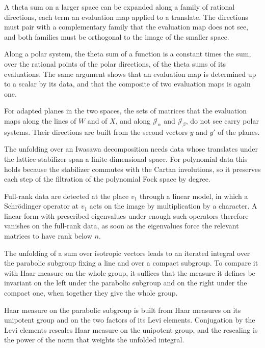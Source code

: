 A theta sum on a larger space can be expanded along a family of rational
directions, each term an evaluation map applied to a translate. The directions
must pair with a complementary family that the evaluation map does not see,
and both families must be orthogonal to the image of the smaller space.

Along a polar system, the theta sum of a function is a constant times the sum,
over the rational points of the polar directions, of the theta sums of its
evaluations. The same argument shows that an evaluation map is determined up
to a scalar by its data, and that the composite of two evaluation maps is
again one.

For adapted planes in the two spaces, the sets of matrices that the evaluation
maps along the lines of $W$ and of $X$, and along $\mathcal J_\alpha$ and
$\mathcal J_\beta$, do not see carry polar systems. Their directions are built
from the second vectors $y$ and $y'$ of the planes.

The unfolding over an Iwasawa decomposition needs data whose translates under
the lattice stabilizer span a finite-dimensional space. For polynomial data
this holds because the stabilizer commutes with the Cartan involutions, so it
preserves each step of the filtration of the polynomial Fock space by degree.

Full-rank data are detected at the place $v_1$ through a linear model, in
which a Schrödinger operator at $v_1$ acts on the image by multiplication by a
character. A linear form with prescribed eigenvalues under enough such operators
therefore vanishes on the full-rank data, as soon as the eigenvalues force the
relevant matrices to have rank below $n$.

The unfolding of a sum over isotropic vectors leads to an iterated integral over
the parabolic subgroup fixing a line and over a compact subgroup. To compare it
with Haar measure on the whole group, it suffices that the measure it defines be
invariant on the left under the parabolic subgroup and on the right under the
compact one, when together they give the whole group.

Haar measure on the parabolic subgroup is built from Haar measures on its
unipotent group and on the two factors of its Levi elements. Conjugation by the
Levi elements rescales Haar measure on the unipotent group, and the rescaling
is the power of the norm that weights the unfolded integral.

